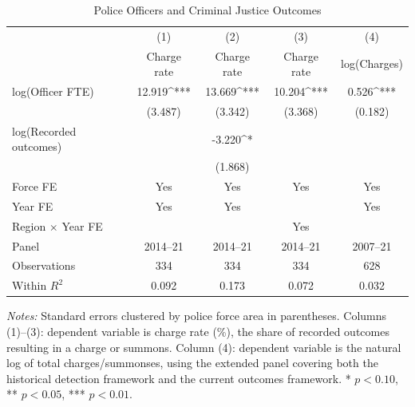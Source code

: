 \begin{table}[ht]
\centering
\caption{Police Officers and Criminal Justice Outcomes}
\label{tab:main}
\begin{tabular}{lcccc}
\hline\hline
 & (1) & (2) & (3) & (4) \\
 & Charge rate & Charge rate & Charge rate & log(Charges) \\
\hline
log(Officer FTE) & 12.919^{***} & 13.669^{***} & 10.204^{***} & 0.526^{***} \\
 & (3.487) & (3.342) & (3.368) & (0.182) \\[6pt]
log(Recorded outcomes) & & -3.220^{*} & & \\
 & & (1.868) & & \\[6pt]
\hline
Force FE & Yes & Yes & Yes & Yes \\
Year FE & Yes & Yes & & Yes \\
Region $\times$ Year FE & & & Yes & \\
Panel & 2014--21 & 2014--21 & 2014--21 & 2007--21 \\
Observations & 334 & 334 & 334 & 628 \\
Within $R^2$ & 0.092 & 0.173 & 0.072 & 0.032 \\
\hline\hline
\end{tabular}
\begin{minipage}{0.92\textwidth}
\vspace{3pt}
\small\textit{Notes:} Standard errors clustered by police force area in parentheses. Columns (1)--(3): dependent variable is charge rate (\%), the share of recorded outcomes resulting in a charge or summons. Column (4): dependent variable is the natural log of total charges/summonses, using the extended panel covering both the historical detection framework and the current outcomes framework. * $p<0.10$, ** $p<0.05$, *** $p<0.01$.
\end{minipage}
\end{table}

